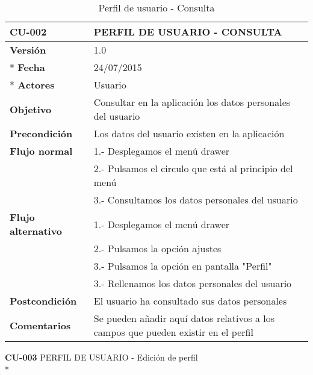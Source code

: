 \documentclass[../pfc.tex]{subfiles}
\begin{document}
	\begin{table}[H]
		\centering
		\begin{tabular}[t]{|p{3cm}|p{9.5cm}|}
			\hline \textbf{CU-002} & \textbf{PERFIL DE USUARIO - CONSULTA} \\*
			\hline\hline \textbf{Versión} & 1.0 \\ *
			\hline\hline \textbf{Fecha} & 24/07/2015 \\ *
			\hline\textbf{Actores} 	& Usuario\\*
			\hline \textbf{Objetivo} & Consultar en la aplicación los datos personales del usuario\\* 			
			\hline \textbf{Precondición} & Los datos del usuario existen en la aplicación \\* 
			\hline \textbf{Flujo normal} & 1.- Desplegamos el menú drawer \\* 
			& 2.- Pulsamos el circulo que está al principio del menú \\*	
			& 3.- Consultamos los datos personales del usuario\\*	
			\hline \textbf{Flujo alternativo} & 1.- Desplegamos el menú drawer \\* 
			& 2.- Pulsamos la opción ajustes \\*	
			& 3.- Pulsamos la opción en pantalla "Perfil" \\*	
			& 3.- Rellenamos los datos personales del usuario \\*	
			\hline \textbf{Postcondición} & El usuario ha consultado sus datos personales\\* 
			\hline \textbf{Comentarios}   & Se pueden añadir aquí datos relativos a los campos que pueden existir en el perfil\\*
			\hline
		\end{tabular}
		\caption{Perfil de usuario - Consulta}
		\label{tabla:caso002}
	\end{table}
	
		
	\textbf{CU-003} PERFIL DE USUARIO - Edición de perfil\\*
	
\end{document}
